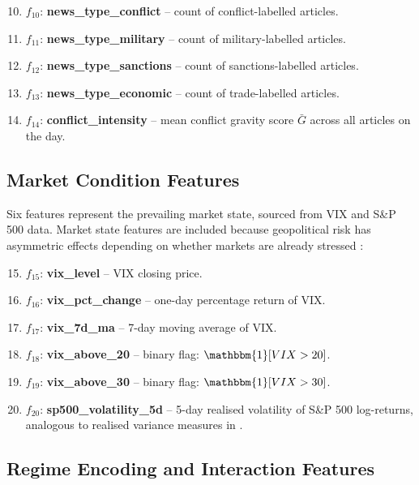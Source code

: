 \documentclass[12pt,a4paper]{report}
\begin{document}
\begin{enumerate}
  \setcounter{enumi}{9}
  \item $f_{10}$: \textbf{news\_type\_conflict} -- count of conflict-labelled
        articles.
  \item $f_{11}$: \textbf{news\_type\_military} -- count of military-labelled
        articles.
  \item $f_{12}$: \textbf{news\_type\_sanctions} -- count of sanctions-labelled
        articles.
  \item $f_{13}$: \textbf{news\_type\_economic} -- count of trade-labelled
        articles.
  \item $f_{14}$: \textbf{conflict\_intensity} -- mean conflict gravity
        score $\bar{G}$ across all articles on the day.
\end{enumerate}

\subsection{Market Condition Features}

Six features represent the prevailing market state, sourced from VIX and
S\&P 500 data. Market state features are included because geopolitical risk
has asymmetric effects depending on whether markets are already stressed
\cite{bloom2009, engle1982}:

\begin{enumerate}
  \setcounter{enumi}{14}
  \item $f_{15}$: \textbf{vix\_level} -- VIX closing price.
  \item $f_{16}$: \textbf{vix\_pct\_change} -- one-day percentage return
        of VIX.
  \item $f_{17}$: \textbf{vix\_7d\_ma} -- 7-day moving average of VIX.
  \item $f_{18}$: \textbf{vix\_above\_20} -- binary flag:
        $\mathbbm{1}[VIX > 20]$.
  \item $f_{19}$: \textbf{vix\_above\_30} -- binary flag:
        $\mathbbm{1}[VIX > 30]$.
  \item $f_{20}$: \textbf{sp500\_volatility\_5d} -- 5-day realised
        volatility of S\&P 500 log-returns, analogous to realised variance
        measures in \cite{bollerslev1986}.
\end{enumerate}

\subsection{Regime Encoding and Interaction Features}
\end{document}
